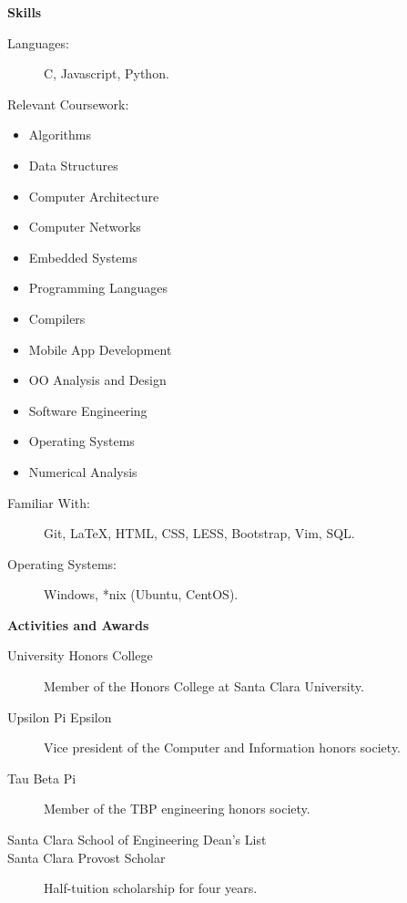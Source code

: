 \documentclass[letterpaper,11pt]{article}
\newcommand{\resheading}[1]{{\large \colorbox{mygrey}{\begin{minipage}{\textwidth}{\textbf{#1 \vphantom{p\^{E}}}}\end{minipage}}}}
\newcommand{\CC}{C\nolinebreak\hspace{-.05em}\raisebox{.4ex}{\tiny\bf +}\nolinebreak\hspace{-.10em}\raisebox{.4ex}{\tiny\bf +}}
\newcommand{\CS}{C\nolinebreak\hspace{-.05em}\raisebox{.4ex}{\scriptsize\bf \#}}
\begin{document}
\resheading{Skills}

\begin{description}
\item[Languages:]
\CC, Javascript, Python.%
\item[Relevant Coursework:]
\end{description}

\vspace*{-\baselineskip}
\begin{multicols}{3}
\begin{itemize}
\itemsep-2pt
\item Algorithms
\item Data Structures
\item Computer Architecture
\item Computer Networks
\item Embedded Systems
\item Programming Languages
\item Compilers
\item Mobile App Development
\item OO Analysis and Design
\item Software Engineering
\item Operating Systems
\item Numerical Analysis 
\end{itemize}
\end{multicols}


\begin{description}
\item[Familiar With:]
Git, \LaTeX, HTML, CSS, LESS, Bootstrap, Vim, SQL.
\item[Operating Systems:]
Windows, *nix (Ubuntu, CentOS).
\end{description}

\resheading{Activities and Awards}

\begin{description}
\item[University Honors College]
Member of the Honors College at Santa Clara University.
\item[Upsilon Pi Epsilon]
Vice president of the Computer and Information honors society.
\item[Tau Beta Pi]
Member of the TBP engineering honors society.
\item[Santa Clara School of Engineering Dean's List]
\item[Santa Clara Provost Scholar]
Half-tuition scholarship for four years.
\end{description}



\end{document}
